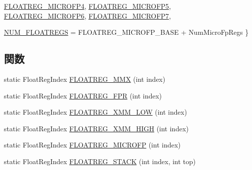 \begin{DoxyCompactItemize}
\par
\hyperlink{namespaceX86ISA_a50e93c80b4d3e47dea8b60bf4b9a4f77a875c37e4154d2325d8da8cb15c4941cf}{FLOATREG\_\-MICROFP4}, 
\hyperlink{namespaceX86ISA_a50e93c80b4d3e47dea8b60bf4b9a4f77aec3fbec2ccab52bc5bc83a7db56bbbec}{FLOATREG\_\-MICROFP5}, 
\hyperlink{namespaceX86ISA_a50e93c80b4d3e47dea8b60bf4b9a4f77a4d6e2301ce4263233a00da7d60c20354}{FLOATREG\_\-MICROFP6}, 
\hyperlink{namespaceX86ISA_a50e93c80b4d3e47dea8b60bf4b9a4f77ae87c5ba95d1c988cf0ac19dbf2b52b22}{FLOATREG\_\-MICROFP7}, 
\par
\hyperlink{namespaceX86ISA_a50e93c80b4d3e47dea8b60bf4b9a4f77ac6d76e7696c1b491a95b087f3d9e9011}{NUM\_\-FLOATREGS} =  FLOATREG\_\-MICROFP\_\-BASE + NumMicroFpRegs
 \}
\end{DoxyCompactItemize}
\subsection*{関数}
\begin{DoxyCompactItemize}
\item 
static FloatRegIndex \hyperlink{namespaceX86ISA_a4fd5045f1ab1c921edbf999a7452de9c}{FLOATREG\_\-MMX} (int index)
\item 
static FloatRegIndex \hyperlink{namespaceX86ISA_ab07809fafe3d56bd3789c7ada8139259}{FLOATREG\_\-FPR} (int index)
\item 
static FloatRegIndex \hyperlink{namespaceX86ISA_a7e1716adfb57ca8bf4794517d887ea54}{FLOATREG\_\-XMM\_\-LOW} (int index)
\item 
static FloatRegIndex \hyperlink{namespaceX86ISA_ac68f196980acc04ce2279fb376e1401b}{FLOATREG\_\-XMM\_\-HIGH} (int index)
\item 
static FloatRegIndex \hyperlink{namespaceX86ISA_af84bb6b9b85a3b7d663b92d1a968f81b}{FLOATREG\_\-MICROFP} (int index)
\item 
static FloatRegIndex \hyperlink{namespaceX86ISA_aa7d52d6d8aa711d769c4fbee2fcd578a}{FLOATREG\_\-STACK} (int index, int top)
\end{DoxyCompactItemize}
